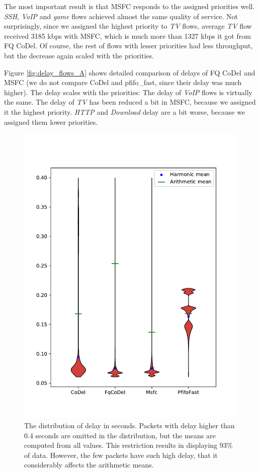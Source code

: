 The most important result is that MSFC responds to the assigned priorities well. \emph{SSH}, \emph{VoIP} and \emph{game} flows achieved almost the same quality of service. Not surprisingly, since we assigned the highest priority to \emph{TV} flows, average \emph{TV} flow received 3185 kbps with MSFC, which is much more than 1327 kbps it got from FQ CoDel. Of course, the rest of flows with lesser priorities had less throughput, but the decrease again scaled with the priorities.

Figure \ref{fig:delay_flows_A} shows detailed comparison of delays of FQ CoDel and MSFC (we do not compare CoDel and pfifo\_fast, since their delay was much higher). The delay scales with the priorities: The delay of \emph{VoIP} flows is virtually the same. The delay of \emph{TV} has been reduced a bit in MSFC, because we assigned it the highest priority. \emph{HTTP} and \emph{Download} delay are a bit worse, because we assigned them lower priorities.


\begin{figure}
	\centering
	\includegraphics[width=137mm]{drawings/overall-delay-down}
	\caption{The distribution of delay in seconds. Packets with delay higher than 0.4 seconds are omitted in the distribution, but the means are computed from all values. This restriction results in displaying 93\% of data. However, the few packets have such high delay, that it considerably affects the arithmetic means. }
	\label{fig:overall_delay}
\end{figure}

